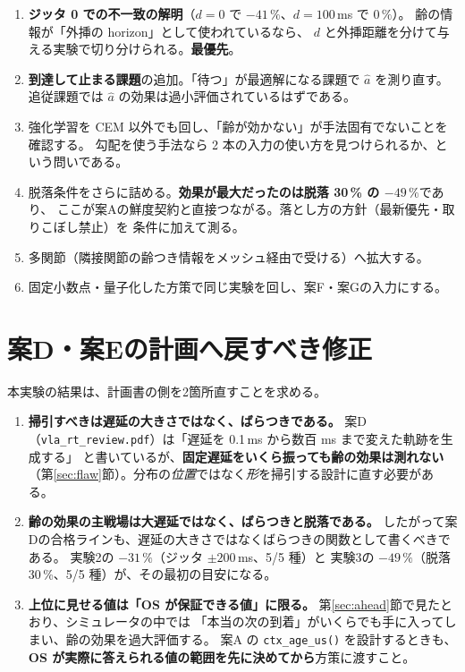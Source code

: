 \documentclass[11pt,a4paper]{article}
\newcommand{\code}[1]{\texttt{#1}}
\newcommand{\prob}[1]{\textbf{\textcolor{red!55!black}{#1}}}
\newcommand{\keyp}[1]{\textbf{\textcolor{blue!45!black}{#1}}}
\begin{document}
\begin{enumerate}[leftmargin=1.8em,itemsep=3pt]
  \item \keyp{ジッタ 0 での不一致の解明}（$d=0$ で $-41\,\%$、$d=100$\,ms で $0\,\%$）。
        齢の情報が「外挿の horizon」として使われているなら、
        $d$ と外挿距離を分けて与える実験で切り分けられる。\keyp{最優先}。
  \item \keyp{到達して止まる課題}の追加。「待つ」が最適解になる課題で $\hat a$ を測り直す。
        追従課題では $\hat a$ の効果は過小評価されているはずである。
  \item 強化学習を CEM 以外でも回し、「齢が効かない」が手法固有でないことを確認する。
        勾配を使う手法なら 2 本の入力の使い方を見つけられるか、という問いである。
  \item 脱落条件をさらに詰める。\keyp{効果が最大だったのは脱落 30\,\% の $-49\,\%$}であり、
        ここが案Aの鮮度契約と直接つながる。落とし方の方針（最新優先・取りこぼし禁止）を
        条件に加えて測る。
  \item 多関節（隣接関節の齢つき情報をメッシュ経由で受ける）へ拡大する。
  \item 固定小数点・量子化した方策で同じ実験を回し、案F・案Gの入力にする。
\end{enumerate}

\section{案D・案Eの計画へ戻すべき修正}

本実験の結果は、計画書の側を2箇所直すことを求める。

\begin{enumerate}[leftmargin=1.8em,itemsep=3pt]
  \item \prob{掃引すべきは遅延の大きさではなく、ばらつきである。}
        案D（\code{vla\_rt\_review.pdf}）は「遅延を 0.1\,ms から数百 ms まで変えた軌跡を生成する」
        と書いているが、\keyp{固定遅延をいくら振っても齢の効果は測れない}
        （第\ref{sec:flaw}節）。分布の\emph{位置}ではなく\emph{形}を掃引する設計に直す必要がある。
  \item \keyp{齢の効果の主戦場は大遅延ではなく、ばらつきと脱落である。}
        したがって案Dの合格ラインも、遅延の大きさではなくばらつきの関数として書くべきである。
        実験2の $-31\,\%$（ジッタ $\pm 200$\,ms、5/5 種）と
        実験3の $-49\,\%$（脱落 30\,\%、5/5 種）が、その最初の目安になる。
  \item \keyp{上位に見せる値は「OS が保証できる値」に限る。}
        第\ref{sec:ahead}節で見たとおり、シミュレータの中では
        「本当の次の到着」がいくらでも手に入ってしまい、齢の効果を過大評価する。
        案A の \code{ctx\_age\_us()} を設計するときも、
        \prob{OS が実際に答えられる値の範囲を先に決めてから}方策に渡すこと。
\end{enumerate}
\end{document}
